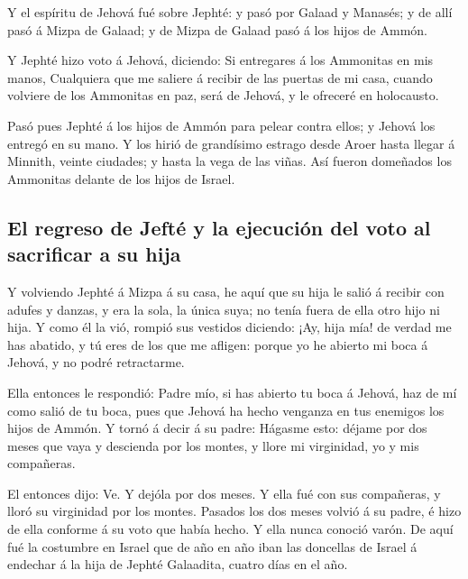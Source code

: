  Y el espíritu de Jehová fué sobre Jephté: y pasó por
Galaad y Manasés; y de allí pasó á Mizpa de Galaad; y de Mizpa de Galaad
pasó á los hijos de Ammón.

 Y Jephté hizo voto á Jehová, diciendo: Si entregares á
los Ammonitas en mis manos,  Cualquiera que me saliere á
recibir de las puertas de mi casa, cuando volviere de los Ammonitas en
paz, será de Jehová, y le ofreceré en holocausto.

 Pasó pues Jephté á los hijos de Ammón para pelear contra
ellos; y Jehová los entregó en su mano.  Y los hirió de
grandísimo estrago desde Aroer hasta llegar á Minnith, veinte ciudades;
y hasta la vega de las viñas. Así fueron domeñados los Ammonitas delante
de los hijos de Israel.

\hypertarget{el-regreso-de-jeftuxe9-y-la-ejecuciuxf3n-del-voto-al-sacrificar-a-su-hija}{%
\subsection{El regreso de Jefté y la ejecución del voto al sacrificar a
su
hija}\label{el-regreso-de-jeftuxe9-y-la-ejecuciuxf3n-del-voto-al-sacrificar-a-su-hija}}

 Y volviendo Jephté á Mizpa á su casa, he aquí que su
hija le salió á recibir con adufes y danzas, y era la sola, la única
suya; no tenía fuera de ella otro hijo ni hija.  Y como
él la vió, rompió sus vestidos diciendo: ¡Ay, hija mía! de verdad me has
abatido, y tú eres de los que me afligen: porque yo he abierto mi boca á
Jehová, y no podré retractarme.

 Ella entonces le respondió: Padre mío, si has abierto tu
boca á Jehová, haz de mí como salió de tu boca, pues que Jehová ha hecho
venganza en tus enemigos los hijos de Ammón.  Y tornó á
decir á su padre: Hágasme esto: déjame por dos meses que vaya y
descienda por los montes, y llore mi virginidad, yo y mis compañeras.

 El entonces dijo: Ve. Y dejóla por dos meses. Y ella fué
con sus compañeras, y lloró su virginidad por los montes.
 Pasados los dos meses volvió á su padre, é hizo de ella
conforme á su voto que había hecho. Y ella nunca conoció varón.
 De aquí fué la costumbre en Israel que de año en año
iban las doncellas de Israel á endechar á la hija de Jephté Galaadita,
cuatro días en el año.

